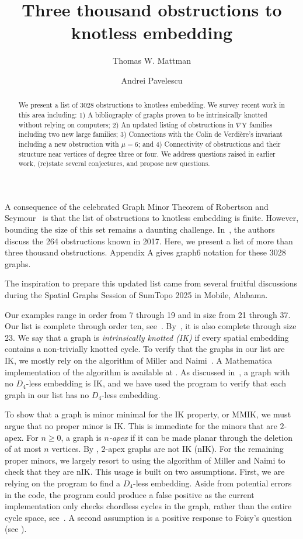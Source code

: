 \documentclass{amsart}
\title{Three thousand obstructions to knotless embedding}
\author{Thomas W. Mattman}
\author{Andrei Pavelescu}
\theoremstyle{remark}
\newcommand{\ty}{\nabla\mathrm{Y}}
\begin{document}
{

\begin{abstract}  
We present a list of 3028 obstructions to knotless embedding. We survey recent work in this area including: 1) A bibliography of
graphs proven to be intrinsically knotted without relying on computers; 2) An updated listing of obstructions in $\ty$ families including two new large families;
3) Connections with the Colin de Verdi\`ere's invariant including a new obstruction with $\mu = 6$;  and 4) Connectivity of obstructions and their
structure near vertices of degree three or four. We address questions raised in earlier work, (re)state several conjectures, and propose new questions.
\end{abstract}

\maketitle

A consequence of the celebrated Graph Minor Theorem of Robertson and Seymour~\cite{RS} is that the list of obstructions to knotless embedding 
is finite. However, bounding the size of this set remains a daunting challenge. In~\cite{FMMNN}, the authors discuss the 264 obstructions known in 2017. 
Here, we present a list of more than three thousand obstructions. Appendix A gives graph6 notation for these 3028 graphs.

The inspiration to prepare this updated list came from
several fruitful discussions during the Spatial Graphs Session of SumTopo 2025 in Mobile, Alabama.

Our examples range in order from 7 through 19 and in size from 21 through 37. 
Our list is complete through order ten, see~\cite{BBFFHL, CG, CMOPRW, FMMNN, KM, MMR}.
By~\cite{BM, FMMNN, KM, LKLO}, it is also complete through size 23.
We say that a graph is {\em intrinsically knotted (IK)} if every spatial embedding contains a non-trivially knotted cycle.
To verify that the graphs in our list are IK, we mostly rely on the algorithm of Miller and Naimi~\cite{MN}.
A Mathematica implementation of the algorithm is available at \cite{N}. As discussed in~\cite{MN}, a graph with no $D_4$-less embedding is IK, 
and we have used the program to verify that each graph in our list has no $D_4$-less embedding.

To show that a graph is minor minimal for the IK property, or MMIK, we must argue that no proper minor is IK. This is immediate for 
the minors that are $2$-apex. For $n \geq 0$, a graph is {\em $n$-apex} if it can be made planar through the deletion of at most $n$ vertices. 
By \cite{BBFFHL,OT}, $2$-apex graphs are not IK (nIK).
For the remaining proper minors, we largely resort to using the algorithm
of Miller and Naimi to check that they are nIK. This usage is built on two assumptions. First, we are relying on the program to find a $D_4$-less
embedding. Aside from potential errors in the code, the program could produce a false positive
as the current implementation only
checks chordless cycles in the graph, rather than the entire cycle space, see~\cite{MN}. A second assumption 
is a positive response to Foisy's question 
(see \cite{MN}).

}
\end{document}
